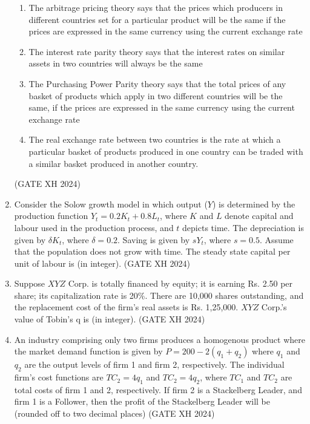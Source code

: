 \documentclass{article}
\begin{document}
\begin{enumerate}
    \begin{enumerate}
        \item The arbitrage pricing theory says that the prices which producers in different countries set for a particular product will be the same if the prices are expressed in the same currency using the current exchange rate
        \item The interest rate parity theory says that the interest rates on similar assets in two countries will always be the same
        \item The Purchasing Power Parity theory says that the total prices of any basket of products which apply in two different countries will be the same, if the prices are expressed in the same currency using the current exchange rate
        \item The real exchange rate between two countries is the rate at which a particular basket of products produced in one country can be traded with a similar basket produced in another country.
    \end{enumerate}  \hfill (GATE XH 2024)

    \item Consider the Solow growth model in which output ($Y$) is determined by the production function $Y_t=0.2K_t+0.8L_t$, where $K$ and $L$ denote capital and labour used in the production process, and $t$ depicts time. The depreciation is given by $\delta K_t$, where $\delta=0.2$. Saving is given by $sY_t$, where $s=0.5$. Assume that the population does not grow with time. The steady state capital per unit of labour is \makebox[1cm]{\hrulefill} (in integer). \hfill (GATE XH 2024)

    \item Suppose $XYZ$ Corp. is totally financed by equity; it is earning Rs. 2.50 per share; its capitalization rate is 20\%. There are 10,000 shares outstanding, and the replacement cost of the firm’s real assets is Rs. 1,25,000. $XYZ$ Corp.’s value of Tobin’s q is \makebox[1cm]{\hrulefill} (in integer).  \hfill (GATE XH 2024)

    \item An industry comprising only two firms produces a homogenous product where the market demand function is given by $P=200-2(q_1+q_2)$ where $q_1$ and $q_2$ are the output levels of firm 1 and firm 2, respectively. The individual firm’s cost functions are $TC_2=4q_1$ and $TC_2=4q_2$, where $TC_1$ and $TC_2$ are total costs of firm 1 and 2, respectively. If firm 2 is a Stackelberg Leader, and firm 1 is a Follower, then the profit of the Stackelberg Leader will be \makebox[1cm]{\hrulefill} (rounded off to two decimal places) \hfill (GATE XH 2024)


\end{enumerate}
\end{document}
